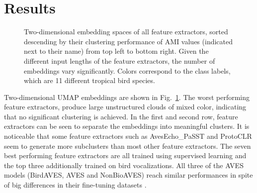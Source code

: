 \section{Results}
\label{sec:results}

\begin{figure}[ht]
    \centerline{}
    \caption{Two-dimensional embedding spaces of all feature extractors, sorted descending by their clustering performance of AMI values (indicated next to their name) from top left to bottom right.
    Given the different input lengths of the feature extractors, the number of embeddings vary significantly.
    Colors correspond to the class labels, which are 11 different tropical bird species.}
    \label{fig:embeds}
\end{figure}


Two-dimensional UMAP embeddings are shown in Fig.~\ref{fig:embeds}.
The worst performing feature extractors, produce large unstructured clouds of mixed color, indicating that no significant clustering is achieved.
In the first and second row, feature extractors can be seen to separate the embeddings into meaningful clusters.
It is noticeable that some feature extractors such as AvesEcho\_PaSST and ProtoCLR seem to generate more subclusters than most other feature extractors.
The seven best performing feature extractors are all trained using supervised learning and the top three additionally trained on bird vocalizations.
All three of the AVES models (BirdAVES, AVES and NonBioAVES) reach similar performances in spite of big differences in their fine-tuning datasets \cite{hagiwara_aves_2022}.

